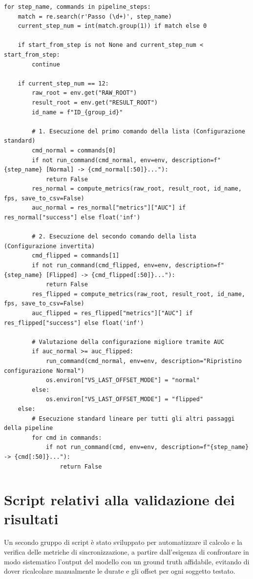 \begin{lstlisting}[style=pythonstyle, caption={Confronto AUC tra configurazione Normal e Flipped}, label={lst:step12_comparison}]
for step_name, commands in pipeline_steps:
    match = re.search(r'Passo (\d+)', step_name)
    current_step_num = int(match.group(1)) if match else 0

    if start_from_step is not None and current_step_num < start_from_step:
        continue

    if current_step_num == 12:
        raw_root = env.get("RAW_ROOT")
        result_root = env.get("RESULT_ROOT")
        id_name = f"ID_{group_id}"

        # 1. Esecuzione del primo comando della lista (Configurazione standard)
        cmd_normal = commands[0]
        if not run_command(cmd_normal, env=env, description=f"{step_name} [Normal] -> {cmd_normal[:50]}..."):
            return False
        res_normal = compute_metrics(raw_root, result_root, id_name, fps, save_to_csv=False)
        auc_normal = res_normal["metrics"]["AUC"] if res_normal["success"] else float('inf')

        # 2. Esecuzione del secondo comando della lista (Configurazione invertita)
        cmd_flipped = commands[1]
        if not run_command(cmd_flipped, env=env, description=f"{step_name} [Flipped] -> {cmd_flipped[:50]}..."):
            return False
        res_flipped = compute_metrics(raw_root, result_root, id_name, fps, save_to_csv=False)
        auc_flipped = res_flipped["metrics"]["AUC"] if res_flipped["success"] else float('inf')

        # Valutazione della configurazione migliore tramite AUC
        if auc_normal >= auc_flipped:
            run_command(cmd_normal, env=env, description="Ripristino configurazione Normal")
            os.environ["VS_LAST_OFFSET_MODE"] = "normal"
        else:
            os.environ["VS_LAST_OFFSET_MODE"] = "flipped"
    else:
        # Esecuzione standard lineare per tutti gli altri passaggi della pipeline
        for cmd in commands:
            if not run_command(cmd, env=env, description=f"{step_name} -> {cmd[:50]}..."):
                return False
\end{lstlisting}

\section{Script relativi alla validazione dei risultati}
Un secondo gruppo di script è stato sviluppato per automatizzare il calcolo e la verifica delle metriche di sincronizzazione, a partire dall'esigenza di confrontare in modo sistematico l'output del modello con un ground truth affidabile, evitando di dover ricalcolare manualmente le durate e gli offset per ogni soggetto testato. 

